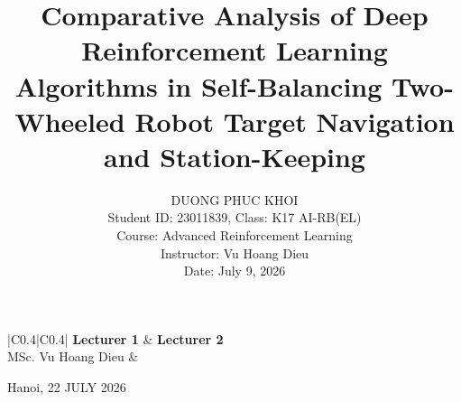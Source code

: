 \documentclass[journal,twocolumn]{IEEEtran}
\begin{document}
\begin{titlepage}
\vspace{1.5cm}

\begin{center}
\end{center}

\vspace{0.5cm}

\begin{center}
\renewcommand{\arraystretch}{1.5}
\begin{tabular}{|C{0.4\textwidth}|C{0.4\textwidth}|}
\hline
\textbf{Lecturer 1} & \textbf{Lecturer 2} \\[0.2cm]
\hline
\vspace*{0.2cm}MSc. Vu Hoang Dieu\vspace*{1.8cm}  & \vspace*{1.8cm} \\[0.2cm]
\hline
\end{tabular}
\end{center}

\vfill

{\large Hanoi, 22 JULY 2026}

\end{titlepage}

\clearpage
\twocolumn 
\justifying 
\title{Comparative Analysis of Deep Reinforcement Learning Algorithms in Self-Balancing Two-Wheeled Robot Target Navigation and Station-Keeping}

\author{DUONG PHUC KHOI \\
Student ID: 23011839, Class: K17 AI-RB(EL) \\
Course: Advanced Reinforcement Learning \\
Instructor: Vu Hoang Dieu \\
Date: July 9, 2026}
\maketitle
\end{document}
